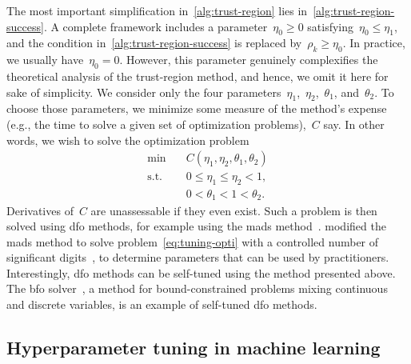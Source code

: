 The most important simplification in~\cref{alg:trust-region} lies in~\cref{alg:trust-region-success}.
A complete framework includes a parameter~$\eta_0 \ge 0$ satisfying~$\eta_0 \le \eta_1$, and the condition in~\cref{alg:trust-region-success} is replaced by~$\rho_k \ge \eta_0$.
In practice, we usually have~$\eta_0 = 0$.
However, this parameter genuinely complexifies the theoretical analysis of the trust-region method, and hence, we omit it here for sake of simplicity.
We consider only the four parameters~$\eta_1$,~$\eta_2$,~$\theta_1$, and~$\theta_2$.
To choose those parameters, we minimize some measure of the method's expense (e.g., the  time to solve a given set of optimization problems),~$C$ say.
In other words, we wish to solve the optimization problem
\begin{subequations}
    \label{eq:tuning-opti}
    \begin{align}
        \min        & \quad C(\eta_1, \eta_2, \theta_1, \theta_2)\\
        \text{s.t.} & \quad 0 \le \eta_1 \le \eta_2 < 1,\\
                    & \quad 0 < \theta_1 < 1 < \theta_2.
    \end{align}
\end{subequations}
Derivatives of~$C$ are unassessable if they even exist.
Such a problem is then solved using \gls{dfo} methods, for example using the \gls{mads} method~\cite{Audet_Orban_2006}.
 modified the \gls{mads} method to solve problem~\cref{eq:tuning-opti} with a controlled number of significant digits~\cite{Audet_Digabel_Tribes_2019}, to determine parameters that can be used by practitioners.
Interestingly, \gls{dfo} methods can be self-tuned using the method presented above.
The \gls{bfo} solver~\cite{Porcelli_Toint_2017}, a method for bound-constrained problems mixing continuous and discrete variables, is an example of self-tuned \gls{dfo} methods.

\subsection{Hyperparameter tuning in machine learning}
\label{subsec:machine-learning}

